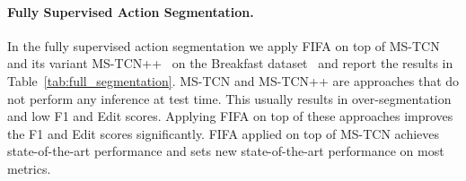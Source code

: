 \begin{comment}
   
\paragraph{Weakly Supervised Action Alignment}
Similar to weakly supervised action segmentation, we apply FIFA on top of CDFL and MuCon for weakly supervised action alignment task and report the results in Table~\ref{tab:weak_alignment}.
Our experiments show that FIFA applied on top of CDFL achieves state-of-the-art or better than state-of-the-art results on MoF and Mof-BG metrics, whereas FIFA applied on top of MuCon achieves state-of-the-art results for IoD and IoU metrics. 

\begin{table}[tb]
    \centering
    \resizebox{\columnwidth}{!}{\begin{tabular}{lcccc}
          \toprule
          Method & MoF & MoF-BG & IoU & IoD \\
          \midrule
          ISBA~\cite{isba} & 53.5 & 51.7 & 35.3 & 52.3\\
          D$^3$TW~\cite{d3tw} & 57.0 & - & - & 56.3\\
          CDFL~\cite{CDFL} & 63.0 & 61.4 & 45.8 & \underline{63.9}\\
          ADP~\cite{ghoddoosian2021action} & \underline{64.1} & \textbf{65.5} & 43.0 & - \\
          \midrule
          FIFA + CDFL$^*$  & \textbf{65.3} & \underline{64.3} & \underline{46.3} & 61.3\\
          FIFA + MuCon$^*$  & 61.4 & 61.2 & \textbf{48.4} & \textbf{64.1}\\
          \bottomrule
       \end{tabular}
     }
    \caption{Results for weakly supervised action alignment on the Breakfast dataset.}
    \label{tab:weak_alignment}
 \end{table}
\end{comment}



\paragraph{Fully Supervised Action Segmentation.}
In the fully supervised action segmentation we apply FIFA on top of MS-TCN~\cite{MS-TCN} and its variant MS-TCN++~\cite{li2020ms} on the Breakfast dataset~\cite{breakfast} and report the results in Table~\ref{tab:full_segmentation}.
MS-TCN and MS-TCN++ are approaches that do not perform any inference at test time. This usually results in over-segmentation and low F1 and Edit scores.
Applying FIFA on top of these approaches improves the F1 and Edit scores significantly.
FIFA applied on top of MS-TCN achieves state-of-the-art performance and sets new state-of-the-art performance on most metrics.

